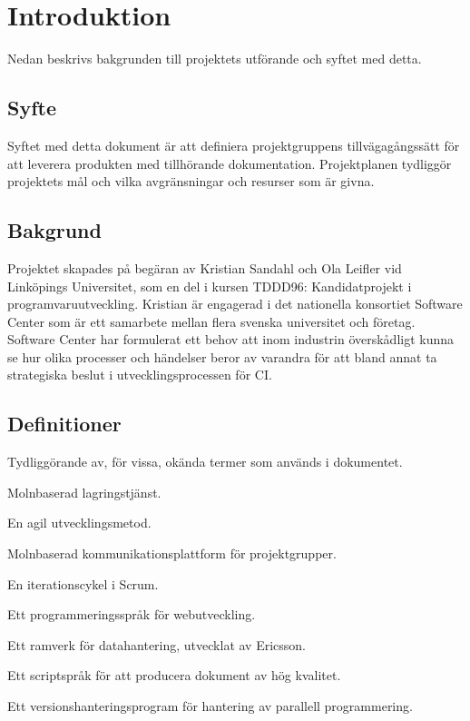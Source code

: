 \section{Introduktion}
Nedan beskrivs bakgrunden till projektets utförande och syftet med detta.

\subsection{Syfte}
Syftet med detta dokument är att definiera projektgruppens tillvägagångssätt för att leverera produkten med tillhörande dokumentation. Projektplanen tydliggör projektets mål och vilka avgränsningar och resurser som är givna.

\subsection{Bakgrund}
Projektet skapades på begäran av Kristian Sandahl och Ola Leifler vid Linköpings Universitet, som en del i kursen TDDD96: Kandidatprojekt i programvaruutveckling. Kristian är engagerad i det nationella konsortiet Software Center som är ett samarbete mellan flera svenska universitet och företag. Software Center har formulerat ett behov att inom industrin överskådligt kunna se hur olika processer och händelser beror av varandra för att bland annat ta strategiska beslut i utvecklingsprocessen för CI.

\subsection{Definitioner}
Tydliggörande av, för vissa, okända termer som används i dokumentet.
\begin{description}[leftmargin=!,labelwidth=\widthof{\bfseries <Google Drive>}]
\item [\bf Google Drive\cite{website:googledrive}] Molnbaserad lagringstjänst.
\item [\bf Scrum\cite{website:scrum}] En agil utvecklingsmetod.
\item [\bf Slack\cite{website:slack}] Molnbaserad kommunikationsplattform för projektgrupper.
\item [\bf Sprint\cite{website:sprint}] En iterationscykel i Scrum.
\item [\bf JavaScript\cite{website:javascript}] Ett programmeringsspråk för webutveckling.
\item [\bf Eiffel\cite{website:eiffel}] Ett ramverk för datahantering, utvecklat av Ericsson.
\item [\bf LaTeX\cite{website:latex}] Ett scriptspråk för att producera dokument av hög kvalitet.
\item [\bf Git\cite{website:git}] Ett versionshanteringsprogram för hantering av parallell programmering.
\end{description}
